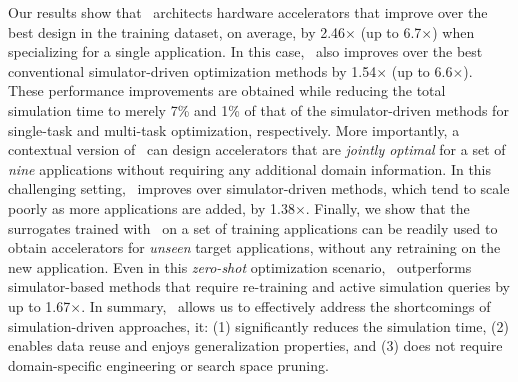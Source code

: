 Our results show that \primemethodname\ architects hardware accelerators that improve over the best design in the training dataset, on average, by 2.46$\times$ (up to 6.7$\times$) when specializing for a single application. 
%
In this case, \primemethodname\ also improves over the best conventional simulator-driven optimization methods by 1.54$\times$ (up to 6.6$\times$).
%
These performance improvements are obtained while reducing the total simulation time to merely 7\% and 1\% of that of the simulator-driven methods for single-task and multi-task optimization, respectively.
%
More importantly, a contextual version of \primemethodname\ can design accelerators that are \emph{jointly optimal} for a set of \textit{nine} applications without requiring any additional domain information.
%
In this challenging setting, \primemethodname\ improves over simulator-driven methods, which tend to scale poorly as more applications are added, by 1.38$\times$.
%
Finally, we show that the surrogates trained with \primemethodname\ on a set of training applications can be readily used to obtain accelerators for \textit{unseen} target applications, without any retraining on the new application.
%
Even in this \emph{zero-shot} optimization scenario, \primemethodname\ outperforms simulator-based methods that require re-training and active simulation queries by up to 1.67$\times$.
%
In summary, \primemethodname\ allows us to effectively address the shortcomings of simulation-driven approaches, it: (1) significantly reduces the simulation time, (2) enables data reuse and enjoys generalization properties, and (3) does not require domain-specific engineering or search space pruning.
%
